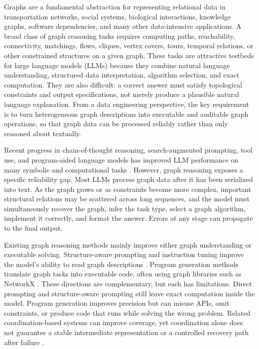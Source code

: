 \documentclass[pdflatex,sn-mathphys-num]{sn-jnl}
\theoremstyle{thmstyleone}
\theoremstyle{thmstyletwo}
\theoremstyle{thmstylethree}
\begin{document}
Graphs are a fundamental abstraction for representing relational data in transportation networks, social systems, biological interactions, knowledge graphs, software dependencies, and many other data-intensive applications. A broad class of graph reasoning tasks requires computing paths, reachability, connectivity, matchings, flows, cliques, vertex covers, tours, temporal relations, or other constrained structures on a given graph. These tasks are attractive testbeds for large language models (LLMs) because they combine natural language understanding, structured data interpretation, algorithm selection, and exact computation. They are also difficult: a correct answer must satisfy topological constraints and output specifications, not merely produce a plausible natural language explanation. From a data engineering perspective, the key requirement is to turn heterogeneous graph descriptions into executable and auditable graph operations, so that graph data can be processed reliably rather than only reasoned about textually.

Recent progress in chain-of-thought reasoning, search-augmented prompting, tool use, and program-aided language models has improved LLM performance on many symbolic and computational tasks \cite{wei2022chain,wang2023selfconsistency,yao2023tree,besta2024graph,gao2023pal,yao2023react}. However, graph reasoning exposes a specific reliability gap. Most LLMs process graph data after it has been serialized into text. As the graph grows or as constraints become more complex, important structural relations may be scattered across long sequences, and the model must simultaneously recover the graph, infer the task type, select a graph algorithm, implement it correctly, and format the answer. Errors at any stage can propagate to the final output.

Existing graph reasoning methods mainly improve either graph understanding or executable solving. Structure-aware prompting and instruction tuning improve the model's ability to read graph descriptions \cite{tang2024graphgpt,chai2023graphllm,graphinstruct2024}. Program generation methods translate graph tasks into executable code, often using graph libraries such as NetworkX \cite{hagberg2008networkx,zhang2025gcoder}. These directions are complementary, but each has limitations. Direct prompting and structure-aware prompting still leave exact computation inside the model. Program generation improves precision but can misuse APIs, omit constraints, or produce code that runs while solving the wrong problem. Related coordination-based systems can improve coverage, yet coordination alone does not guarantee a stable intermediate representation or a controlled recovery path after failure \cite{li2024graphteam}.
\end{document}
